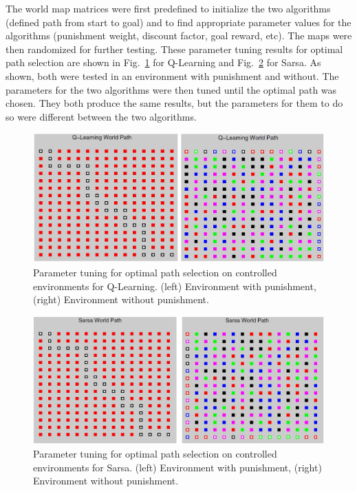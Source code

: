 \documentclass[12pt,american]{report}
\begin{document}
The world map matrices were first predefined to initialize the two algorithms (defined path from start to goal) and to find appropriate parameter values for the algorithms (punishment weight, discount factor, goal reward, etc).  The maps were then randomized for further testing. These parameter tuning results for optimal path selection are shown in Fig.~\ref{fig:qlearning-optimal} for Q-Learning and Fig.~\ref{fig:sarsa-optimal} for Sarsa.  As shown, both were tested in an environment with punishment and without. The parameters for the two algorithms were then tuned until the optimal path was chosen. They both produce the same results, but the parameters for them to do so were different between the two algorithms.  
\begin{figure}
\centering
\includegraphics[scale=.75]{images/qlearning-optimal.png}
\caption{Parameter tuning for optimal path selection on controlled environments for Q-Learning. (left) Environment with punishment, (right) Environment without punishment.}
\label{fig:qlearning-optimal}
\end{figure}
\begin{figure}
\centering
\includegraphics[scale=.75]{images/sarsa-optimal.png}
\caption{Parameter tuning for optimal path selection on controlled environments for Sarsa. (left) Environment with punishment, (right) Environment without punishment.}
\label{fig:sarsa-optimal}
\end{figure}
\end{document}
